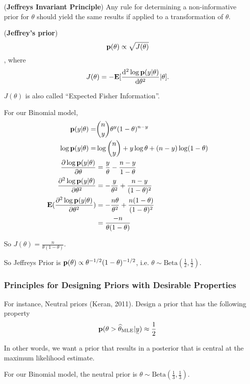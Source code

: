 \begin{theorem}
(\textbf{Jeffreys Invariant Principle}) Any rule for determining a non-informative prior for $\theta$ should yield the same results if applied to a transformation of $\theta$.
\end{theorem}

\begin{definition}
(\textbf{Jeffrey's prior})
\[
    {\mathbf p}(\theta) \propto \sqrt{J(\theta)}
\]
, where
\[
J(\theta) = - {\mathbf E}[\frac{\mathop{}\!\mathrm{d}^2 \log {\mathbf p}(y|\theta)}{\mathop{}\!\mathrm{d} \theta^2} | \theta].
\]

$J(\theta)$ is also called ``Expected Fisher Information''.
\end{definition}

For our Binomial model,
\begin{align*}
    {\mathbf p}(y|\theta) 
    =& \binom{n}{y} \theta^y (1-\theta)^{n-y}\\
    \log {\mathbf p}(y|\theta) 
    =& \log \binom{n}{y} + y \log \theta + (n-y) \log (1 - \theta)\\
    \pdv{\log {\mathbf p}(y|\theta)}{\theta} 
    &= \frac{y}{\theta} - \frac{n-y}{1 - \theta}\\
    \pdv[2]{\log {\mathbf p}(y|\theta)}{\theta} 
    &=  -\frac{y}{\theta^2} + \frac{n-y}{(1 - \theta)^2}\\
    {\mathbf E}(\pdv[2]{\log {\mathbf p}(y|\theta)}{\theta}) 
    &=  -\frac{n\theta}{\theta^2} + \frac{n(1-\theta)}{(1 - \theta)^2}\\
    &=  \frac{-n}{\theta(1-\theta)}
\end{align*}

So $J(\theta) = \frac{n}{\theta(1-\theta)}$. 

So Jeffreys Prior is ${\mathbf p}(\theta) \propto \theta^{-1/2} (1-\theta)^{-1/2}$, i.e. $\theta \sim \text{Beta}(\frac{1}{2}, \frac{1}{2})$.

\subsubsection{Principles for Designing Priors with Desirable Properties}

For instance, Neutral priors (Keran, 2011). Design a prior that has the following property
\[
\p(\theta > \hat \theta_\MLE | \vec{y}) \approx \frac{1}{2}
\]

In other words, we want a prior that results in a posterior that is central at the maximum likelihood estimate.

For our Binomial model, the neutral prior is $\theta \sim \text{Beta}(\frac{1}{3}, \frac{1}{3})$.